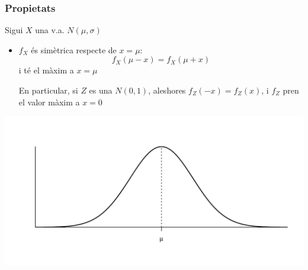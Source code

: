 \documentclass[12pt,t]{beamer}\usepackage[]{graphicx}\usepackage[]{color}
\renewcommand{\leq}{\leqslant}
\theoremstyle{plain}
\theoremstyle{definition}
\begin{document}
\begin{frame}
\frametitle{Propietats} 
\vspace*{-1ex}

Sigui $X$ una v.a. $N(\mu,\sigma)$
\medskip

\begin{itemize}
\item $f_X$ és simètrica respecte de $x=\mu$:
$$
f_{X}(\mu-x)=f_{X}(\mu+x)
$$
i té el màxim a $x=\mu$
\medskip

En particular, si $Z$ es una $N(0,1)$, aleshores
$f_{Z}(-x)=f_{Z}(x)$, i $f_Z$ pren el valor màxim a $x=0$
\end{itemize}
\vspace*{-5ex}

\begin{center}
\includegraphics[width=\linewidth]{simn}
\end{center}
\end{frame}

%
%
%
\end{document}
